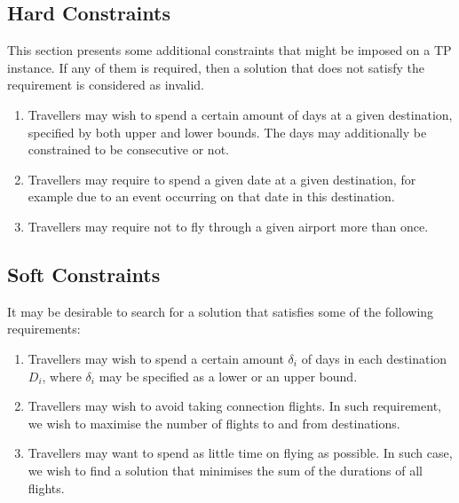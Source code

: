 \documentclass{mprop}
\theoremstyle{definition}
\begin{document}
\subsection{Hard Constraints}
\label{subsec:hardconstraints}
This section presents some additional constraints that might be imposed on a TP instance. If any of them is required, then a solution that does not satisfy the requirement is considered as invalid.

\begin{enumerate}
\item Travellers may wish to spend a certain amount of days at a given destination, specified by both upper and lower bounds. The days may additionally be constrained to be consecutive or not.

\item Travellers may require to spend a given date at a given destination, for example due to an event occurring on that date in this destination.

\item Travellers may require not to fly through a given airport more than once.
\end{enumerate}

\subsection{Soft Constraints}
\label{subsec:softconstraints}
It may be desirable to search for a solution that satisfies some of the following requirements:

\begin{enumerate}
\item Travellers may wish to spend a certain amount $\delta_{i}$ of days in each destination $D_{i}$, where $\delta_{i}$ may be specified as a lower or an upper bound.

\item Travellers may wish to avoid taking connection flights. In such requirement, we wish to maximise the number of flights to and from destinations.

\item Travellers may want to spend as little time on flying as possible. In such case, we wish to find a solution that minimises the sum of the durations of all flights.
\end{enumerate}
\end{document}
